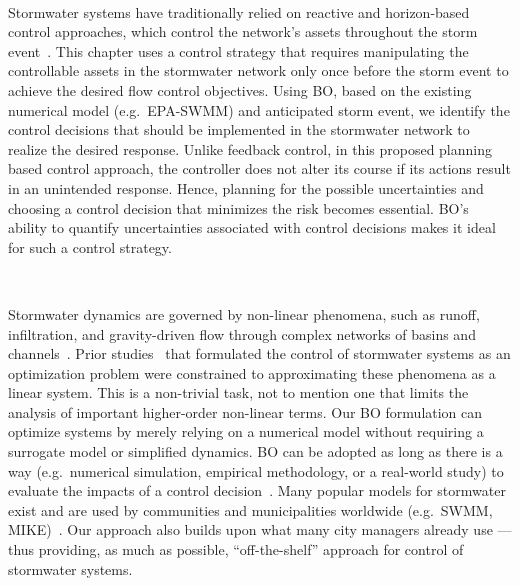 \

Stormwater systems have traditionally relied on reactive and horizon-based control approaches, which control the network's assets throughout the storm event~\cite{sadler2019, vezzaro2014, Troutman_2020}.
This chapter uses a control strategy that requires manipulating the controllable assets in the stormwater network only once before the storm event to achieve the desired flow control objectives.
Using BO, based on the existing numerical model (e.g.\ EPA-SWMM) and anticipated storm event, we identify the control decisions that should be implemented in the stormwater network to realize the desired response.
Unlike feedback control, in this proposed planning based control approach, the controller does not alter its course if its actions result in an unintended response. 
Hence, planning for the possible uncertainties and choosing a control decision that minimizes the risk becomes essential.
BO's ability to quantify uncertainties associated with control decisions makes it ideal for such a control strategy.


\

Stormwater dynamics are governed by non-linear phenomena, such as runoff, infiltration, and gravity-driven flow through complex networks of basins and channels~\cite{Rossman2015a, Mullapudi_Wong_Kerkez_2017, Rimer2019}.
Prior studies~\cite{lund2020cso} that formulated the control of stormwater systems as an optimization problem were constrained to approximating these phenomena as a linear system.
This is a non-trivial task, not to mention one that limits the analysis of important higher-order non-linear terms. 
Our BO formulation can optimize systems by merely relying on a numerical model without requiring a surrogate model or simplified dynamics.
BO can be adopted as long as there is a way (e.g.\ numerical simulation, empirical methodology, or a real-world study) to evaluate the impacts of a control decision~\cite{frazier2018tutorial}.
Many popular models for stormwater exist and are used by communities and municipalities worldwide (e.g.\ SWMM, MIKE)~\cite{Rossman2015a}.
Our approach also builds upon what many city managers already use --- thus providing, as much as possible, ``off-the-shelf'' approach for control of stormwater systems.


\

